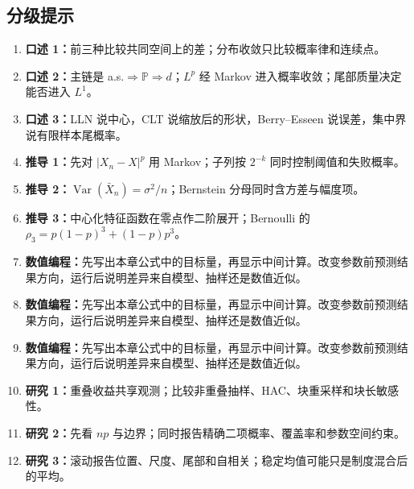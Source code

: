 \subsection*{分级提示}
\begingroup\small
\begin{enumerate}[nosep,leftmargin=*]
  \item \textbf{口述 1：}前三种比较共同空间上的差；分布收敛只比较概率律和连续点。
  \item \textbf{口述 2：}主链是 a.s.$\Rightarrow\mathbb P\Rightarrow d$；$L^p$ 经 Markov 进入概率收敛；尾部质量决定能否进入 $L^1$。
  \item \textbf{口述 3：}LLN 说中心，CLT 说缩放后的形状，Berry--Esseen 说误差，集中界说有限样本尾概率。
  \item \textbf{推导 1：}先对 $|X_n-X|^p$ 用 Markov；子列按 $2^{-k}$ 同时控制阈值和失败概率。
  \item \textbf{推导 2：}$\operatorname{Var}(\bar X_n)=\sigma^2/n$；Bernstein 分母同时含方差与幅度项。
  \item \textbf{推导 3：}中心化特征函数在零点作二阶展开；Bernoulli 的 $\rho_3=p(1-p)^3+(1-p)p^3$。
  \item \textbf{数值编程：}先写出本章公式中的目标量，再显示中间计算。改变参数前预测结果方向，运行后说明差异来自模型、抽样还是数值近似。
  \item \textbf{数值编程：}先写出本章公式中的目标量，再显示中间计算。改变参数前预测结果方向，运行后说明差异来自模型、抽样还是数值近似。
  \item \textbf{数值编程：}先写出本章公式中的目标量，再显示中间计算。改变参数前预测结果方向，运行后说明差异来自模型、抽样还是数值近似。
  \item \textbf{研究 1：}重叠收益共享观测；比较非重叠抽样、HAC、块重采样和块长敏感性。
  \item \textbf{研究 2：}先看 $np$ 与边界；同时报告精确二项概率、覆盖率和参数空间约束。
  \item \textbf{研究 3：}滚动报告位置、尺度、尾部和自相关；稳定均值可能只是制度混合后的平均。
\end{enumerate}
\endgroup


\MFQMappedUpperChNineHints
